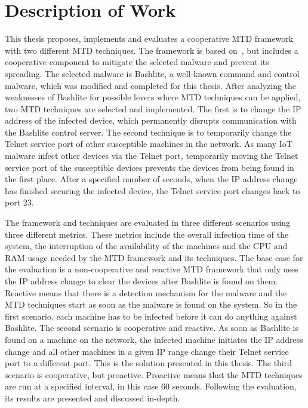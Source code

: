\section{Description of Work}
This thesis proposes, implements and evaluates a cooperative MTD framework with two different MTD techniques. The framework is based on~\cite{article:Cedeno}, but includes a cooperative component to mitigate the selected malware and prevent its spreading. The selected malware is Bashlite, a well-known command and control malware, which was modified and completed for this thesis. After analyzing the weaknesses of Bashlite for possible levers where MTD techniques can be applied, two MTD techniques are selected and implemented. The first is to change the IP address of the infected device, which permanently disrupts communication with the Bashlite control server. The second technique is to temporarily change the Telnet service port of other susceptible machines in the network. As many IoT malware infect other devices via the Telnet port, temporarily moving the Telnet service port of the susceptible devices prevents the devices from being found in the first place. After a specified number of seconds, when the IP address change has finished securing the infected device, the Telnet service port changes back to port 23.

The framework and techniques are evaluated in three different scenarios using three different metrics. These metrics include the overall infection time of the system, the interruption of the availability of the machines and the CPU and RAM usage needed by the MTD framework and its techniques. The base case for the evaluation is a non-cooperative and reactive MTD framework that only uses the IP address change to clear the devices after Bashlite is found on them. Reactive means that there is a detection mechanism for the malware and the MTD techniques start as soon as the malware is found on the system. So in the first scenario, each machine has to be infected before it can do anything against Bashlite. The second scenario is cooperative and reactive. As soon as Bashlite is found on a machine on the network, the infected machine initiates the IP address change and all other machines in a given IP range change their Telnet service port to a different port. This is the solution presented in this thesis. The third scenario is cooperative, but proactive. Proactive means that the MTD techniques are run at a specified interval, in this case 60 seconds. Following the evaluation, its results are presented and discussed in-depth. 


